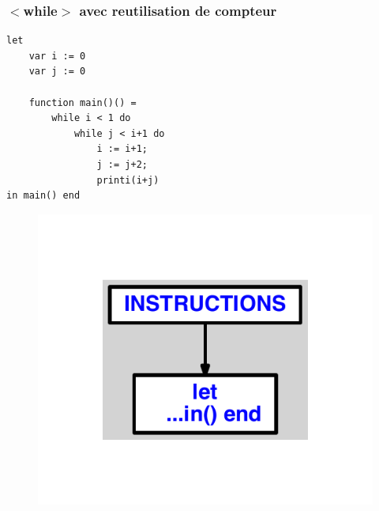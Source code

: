 \documentclass{article}
\begin{document}
\subsubsection{$ < $while$ > $ avec reutilisation de compteur}
\begin{lstlisting}
let
	var i := 0
	var j := 0

	function main()() =
		while i < 1 do
			while j < i+1 do
				i := i+1;
				j := j+2;
				printi(i+j)
in main() end
\end{lstlisting}
\newpage
\begin{figure}[H]
\centering
\includegraphics[max width=\textwidth]{ast/ast_338.pdf}
\end{figure}
\newpage
\end{document}
